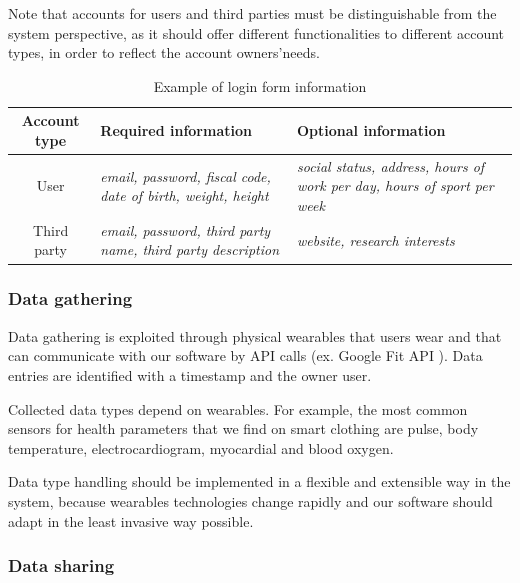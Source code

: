 \documentclass[12pt]{article}
\begin{document}
      Note that accounts for users and third parties must be distinguishable from the system perspective, as it should offer different functionalities to different account types, in order to reflect the account owners'needs.

      \begin{table}[h!]
        \centering
        \begin{tabularx}{\linewidth}{|c|X|X|}
          \hline
          \textbf{Account type} & \textbf{Required information}                                       & \textbf{Optional information}                                                   \\ \hline
          User                  & \textit{email, password, fiscal code, date of birth, weight, height}             & \textit{social status, address, hours of work per day, hours of sport per week} \\ \hline
          Third party           & \textit{email, password, third party name, third party description} & \textit{website, research interests}                                            \\ \hline
        \end{tabularx}
        \caption{Example of login form information}
        \label{tab:login}
      \end{table}

    \subsubsection{Data gathering}

      Data gathering is exploited through physical wearables that users wear and that can communicate with our software by API calls (ex. Google Fit API \cite{googlefitapi}). Data entries are identified with a timestamp and the owner user.

      Collected data types depend on wearables. For example, the most common sensors for health parameters that we find on smart clothing \cite{sensors} are pulse, body temperature, electrocardiogram, myocardial and blood oxygen.

      Data type handling should be implemented in a flexible and extensible way in the system, because wearables technologies change rapidly and our software should adapt in the least invasive way possible.

    \subsubsection{Data sharing}
\end{document}
